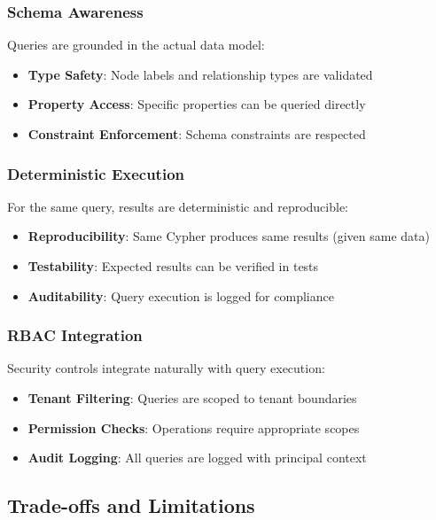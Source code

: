 \subsubsection{Schema Awareness}

Queries are grounded in the actual data model:

\begin{itemize}
    \item \textbf{Type Safety}: Node labels and relationship types are validated
    \item \textbf{Property Access}: Specific properties can be queried directly
    \item \textbf{Constraint Enforcement}: Schema constraints are respected
\end{itemize}

\subsubsection{Deterministic Execution}

For the same query, results are deterministic and reproducible:

\begin{itemize}
    \item \textbf{Reproducibility}: Same Cypher produces same results (given same data)
    \item \textbf{Testability}: Expected results can be verified in tests
    \item \textbf{Auditability}: Query execution is logged for compliance
\end{itemize}

\subsubsection{RBAC Integration}

Security controls integrate naturally with query execution:

\begin{itemize}
    \item \textbf{Tenant Filtering}: Queries are scoped to tenant boundaries
    \item \textbf{Permission Checks}: Operations require appropriate scopes
    \item \textbf{Audit Logging}: All queries are logged with principal context
\end{itemize}

\subsection{Trade-offs and Limitations}

